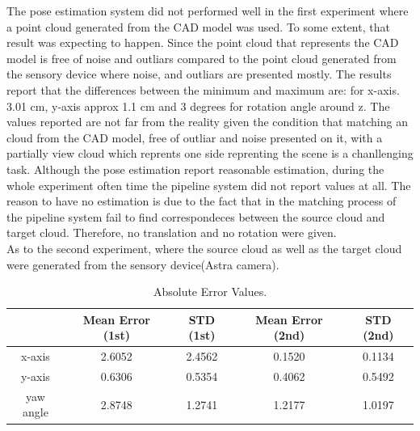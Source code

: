 The pose estimation system did not performed well in the first experiment where a point cloud generated from the CAD model was used. To some extent, that result was expecting to happen. Since the point cloud that represents the CAD model is free of noise and outliars compared to the point cloud generated from the sensory device where noise, and outliars are presented mostly. The results report that the differences between the minimum and maximum are: for x-axis. 3.01 cm, y-axis approx 1.1 cm and 3 degrees for rotation angle around z. The values reported are not far from the reality given the condition that matching an cloud from the CAD model, free of outliar and noise presented on it, with a partially view cloud which reprents one side reprenting the scene is a chanllenging task. Although the pose estimation report reasonable estimation, during the whole experiment often time the pipeline system did not report values at all. The reason to have no estimation is due to the fact that in the matching process of the pipeline system fail to find correspondeces between the source cloud and target cloud. Therefore, no translation and no rotation were given.  \\

As to the second experiment, where the source cloud as well as the target cloud were generated from the sensory device(Astra camera). 

\begin{table}[ht]
\renewcommand{\arraystretch}{1.3}
\caption{Absolute Error Values.}
\label{real1}
\centering
\begin{tabular}{|c||c||c||c||c|}
\hline
  & Mean Error (1st)& STD (1st) &  Mean Error (2nd)& STD (2nd) \\
\hline
x-axis & 2.6052 & 2.4562 & 0.1520 & 0.1134\\
\hline
y-axis & 0.6306 & 0.5354 & 0.4062 & 0.5492\\
\hline
yaw angle & 2.8748 & 1.2741 & 1.2177 & 1.0197\\
\hline
\hline
\end{tabular}
\end{table}


